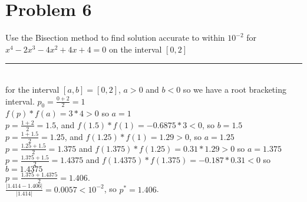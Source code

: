 \documentclass[20pt]{article} %
\begin{document}
\section{Problem 6}
Use the Bisection method to find solution accurate to within $10^{-2}$ for $x^4 - 2x^3 - 4x^2 + 4x +4 = 0$ on the interval $[0,2]$\\
\noindent\rule{2cm}{0.4pt} \\
for the interval $[a,b] = [0,2]$, $a>0$ and $b<0$ so we have a root bracketing interval. $p_0 = \frac{0+2}{2} = 1$ \\ 
$f(p) * f(a) = 3 * 4 > 0$ so $a= 1$ \\
$p = \frac{1 + 2}{2} = 1.5$, and $f(1.5) * f(1) = -0.6875 * 3 < 0$, so $b = 1.5$ \\
$p = \frac{1 + 1.5}{2} = 1.25$, and $f(1.25) * f(1) = 1.29 > 0$, so $a = 1.25$ \\
$p = \frac{1.25 + 1.5}{2} = 1.375$ and $f(1.375) * f(1.25) = 0.31*1.29 > 0$ so $a = 1.375$ \\
$p = \frac{1.375 + 1.5}{2} = 1.4375$ and $f(1.4375) * f(1.375) = -0.187 * 0.31 < 0$ so $b = 1.4375$ \\ 
$p = \frac{1.375 + 1.4375}{2} = 1.406.$\\
$\frac{|1.414 - 1.406|}{|1.414|} = 0.0057 < 10^{-2}$, so $p^* = 1.406$.
\end{document}
